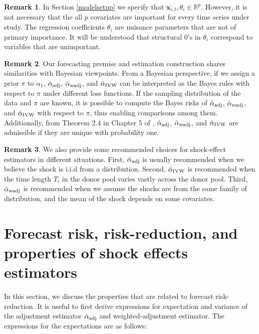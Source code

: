\documentclass[11pt,3p,review,authoryear]{elsarticle}
\def\mbf#1{\mathbf{#1}} %
\newcommand{\reals}{\mathbb{R}} %
\theoremstyle{definition}
\newtheorem{remark}{Remark}
\begin{document}
\begin{remark}
\label{remark1}In Section \ref{modelsetup} we specify that $\mbf{x}_{i,t}, \theta_i \in \reals^p$. 
However, it is not necessary that the all $p$ covariates are important for every time series under study. The regression coefficients $\theta_i$ are nuisance parameters that are not of primary importance. 
It will be understood that structural 0's in $\theta_i$ correspond to variables that are unimportant. 
\end{remark}

\begin{remark}
  Our forecasting premise and estimation construction shares similarities with Bayesian viewpoints. From a Bayesian perspective, if we assign a prior $\pi$ to $\alpha_1$, $\hat{\alpha}_{\rm adj}$, $\hat{\alpha}_{\rm wadj}$, and $\hat{\alpha}_{\rm IVW}$ can be interpreted as the Bayes rules with respect to $\pi$ under different loss functions. If the sampling distribution of the data and $\pi$ are known, it is possible to compute the Bayes risks of $\hat{\alpha}_{\rm adj}$, $\hat{\alpha}_{\rm wadj}$, and $\hat{\alpha}_{\rm IVW}$ with respect to $\pi$,  thus enabling comparisons among them. Additionally, from Theorem 2.4 in Chapter 5 of \cite{lehmann2006theory}, $\hat{\alpha}_{\rm adj}$, $\hat{\alpha}_{\rm wadj}$, and $\hat{\alpha}_{\rm IVW}$ are admissible if they are unique with probability one.
\end{remark}

\begin{remark}
We also provide some recommended choices for shock-effect estimators in different situations. First, $\hat{\alpha}_{\rm adj}$ is usually recommended when we believe the shock is i.i.d from a distribution. Second, $\hat{\alpha}_{\rm IVW}$ is recommended when the time length $T_i$ in the donor pool varies vastly across the donor pool. Third, $\hat{\alpha}_{\rm wadj}$  is recommended when we assume the shocks are from the same family of distribution, and the mean of the shock depends on some covariates.
\end{remark}



\section{Forecast risk, risk-reduction, and properties of shock effects estimators}
\label{properties}

In this section, we discuss the properties that are related to forecast risk-reduction. It is useful to first derive expressions for expectation and variance of the adjustment estimator $\hat{\alpha}_{\rm adj}$ and weighted-adjustment estimator.  The expressions for the expectations are as follows: 
\end{document}

